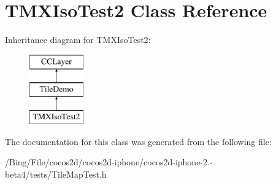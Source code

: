 \hypertarget{interface_t_m_x_iso_test2}{\section{T\-M\-X\-Iso\-Test2 Class Reference}
\label{interface_t_m_x_iso_test2}
}
Inheritance diagram for T\-M\-X\-Iso\-Test2\-:\begin{figure}[H]
\begin{center}
\leavevmode
\includegraphics[height=3.000000cm]{interface_t_m_x_iso_test2}
\end{center}
\end{figure}


The documentation for this class was generated from the following file\-:\begin{DoxyCompactItemize}
\item 
/\-Bing/\-File/cocos2d/cocos2d-\/iphone/cocos2d-\/iphone-\/2.-\/beta4/tests/Tile\-Map\-Test.\-h\end{DoxyCompactItemize}

